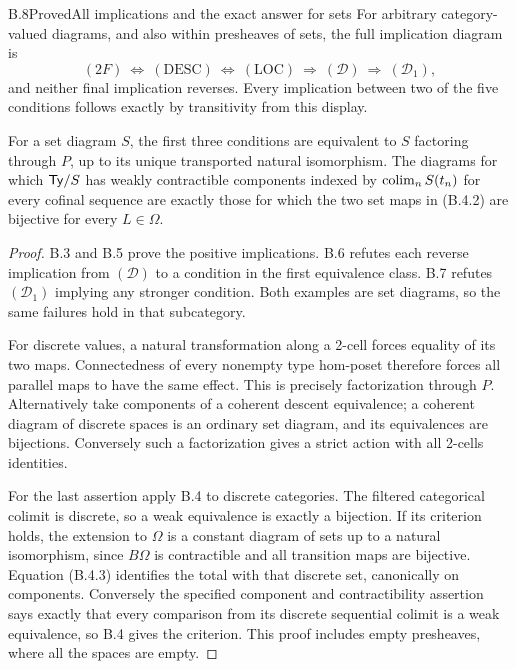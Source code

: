\begin{claim}{B.8}{Proved}{All implications and the exact answer for sets}
\label{B:table}
For arbitrary category-valued diagrams, and also within
presheaves of sets, the full implication diagram is
\[
 (2F)\ \Longleftrightarrow\ (\mathrm{DESC})
 \ \Longleftrightarrow\ (\mathrm{LOC})
 \ \Longrightarrow\ (\mathcal D)
 \ \Longrightarrow\ (\mathcal D_1),
\]
and neither final implication reverses. Every implication
between two of the five conditions follows exactly by
transitivity from this display.

For a set diagram $S$, the first three conditions are equivalent
to $S$ factoring through $P$, up to its unique transported natural
isomorphism. The diagrams for which $\mathsf{Ty}/S$ has weakly
contractible components indexed by $\operatorname*{colim}_n S(t_n)$ for every
cofinal sequence are exactly those for which the two set maps
in (B.4.2) are bijective for every $L\in\Omega$.
\end{claim}
\begin{proof}
B.3 and B.5 prove the positive implications. B.6 refutes each
reverse implication from $(\mathcal D)$ to a condition in the
first equivalence class. B.7 refutes $(\mathcal D_1)$ implying
any stronger condition. Both examples are set diagrams, so
the same failures hold in that subcategory.

For discrete values, a natural transformation along a 2-cell
forces equality of its two maps. Connectedness of every
nonempty type hom-poset therefore forces all parallel maps
to have the same effect. This is precisely factorization
through $P$. Alternatively take components of a coherent
descent equivalence; a coherent diagram of discrete spaces is
an ordinary set diagram, and its equivalences are bijections.
Conversely such a factorization gives a strict action with
all 2-cells identities.

For the last assertion apply B.4 to discrete categories. The
filtered categorical colimit is discrete, so a weak equivalence
is exactly a bijection. If its criterion holds, the extension
to $\Omega$ is a constant diagram of sets up to a natural
isomorphism, since $B\Omega$ is contractible and all transition
maps are bijective. Equation (B.4.3) identifies the total with
that discrete set, canonically on components. Conversely the
specified component and contractibility assertion says exactly
that every comparison from its discrete sequential colimit is
a weak equivalence, so B.4 gives the criterion. This proof
includes empty presheaves, where all the spaces are empty.
\end{proof}

